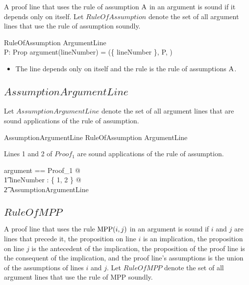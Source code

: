 \documentclass[11pt, oneside]{article}
\begin{document}
A proof line that uses the rule of assumption $\operatorname{A}$ in an argument is sound if it depends only on itself.
Let $RuleOfAssumption$ denote the set of all argument lines that use the rule of assumption soundly.

\begin{schema}{RuleOfAssumption}
	ArgumentLine \\
	P: Prop
\where
	argument(lineNumber) = (\{ lineNumber \}, P,  )
\end{schema}

\begin{itemize}
\item The line depends only on itself and the rule is the rule of assumptions $\operatorname{A}$.
\end{itemize}

\subsection{$AssumptionArgumentLine$}

Let $AssumptionArgumentLine$ denote the set of all argument lines that are sound applications
of the rule of assumption.

\begin{zed}
	AssumptionArgumentLine  RuleOfAssumption \project ArgumentLine
\end{zed}

\begin{example}
Lines 1 and 2 of $Proof_1$ are sound applications of the rule of assumption.

\begin{zed}
	\LET	argument == Proof_1 @ \\
	\t1	\forall lineNumber : \{ 1, 2 \} @ \\
	\t2		AssumptionArgumentLine
\end{zed}

\end{example}

\subsection{$RuleOfMPP$}

A proof line that uses the rule $\operatorname{MPP}(i,j)$ in an argument is sound if $i$ and $j$ are lines
that precede it, the proposition on line $i$ is an implication, the proposition on line $j$ is the antecedent
of the implication, the proposition of the proof line is the consequent of the implication,
and the proof line's assumptions is the union of the assumptions of lines $i$ and $j$.
Let $RuleOfMPP$ denote the set of all argument lines that use the rule of MPP soundly.
\end{document}
